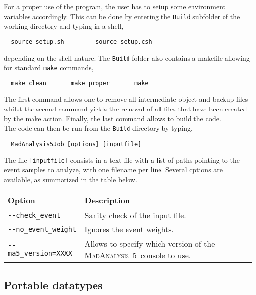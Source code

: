\documentclass[a4paper]{article}
\newcommand{\MA}{\textsc{MadAnalysis}~5}
\begin{document}
\noindent For a proper use of the program, the user has to setup some environment
variables accordingly. This can be done by entering the \verb+Build+ subfolder
of the working directory and typing in a shell,
{\color{ao}\begin{verbatim}
  source setup.sh         source setup.csh
\end{verbatim}}
\noindent depending on the shell nature. The \verb+Build+ folder also contains a makefile
allowing for standard \verb+make+ commands,
{\color{ao}\begin{verbatim}
  make clean       make proper       make
\end{verbatim}}
\noindent The first command allows one to remove all intermediate object and backup
files whilst the second command yields the removal of all files that have been
created by the make action. Finally, the last command allows to build the code.\\

\noindent The code can then be run from the \verb+Build+
directory by typing,
{\color{ao}\begin{verbatim}
  MadAnalysis5Job [options] [inputfile]
\end{verbatim}}
\noindent The file {\color{ao}\verb?[inputfile]?} consists in a text file with a list of paths
pointing to the event samples to analyze, with one filename per line. Several
options are available, as summarized in the table below.
\renewcommand{\arraystretch}{1.2}%
\begin{center}\begin{tabular}{l p{8.4cm}}
\hline
Option & Description\\
\hline
\color{ao}\verb?--check_event?      & Sanity check of the input file.\\
\color{ao}\verb?--no_event_weight?  & Ignores the event weights.\\
\color{ao}\verb?--ma5_version=XXXX? & Allows to specify which version of the \MA\ console
  to use.\\
\hline
\end{tabular}
\end{center}
\newpage

\begin{shaded}
\section{\Large Portable datatypes}
\end{shaded}
\end{document}
